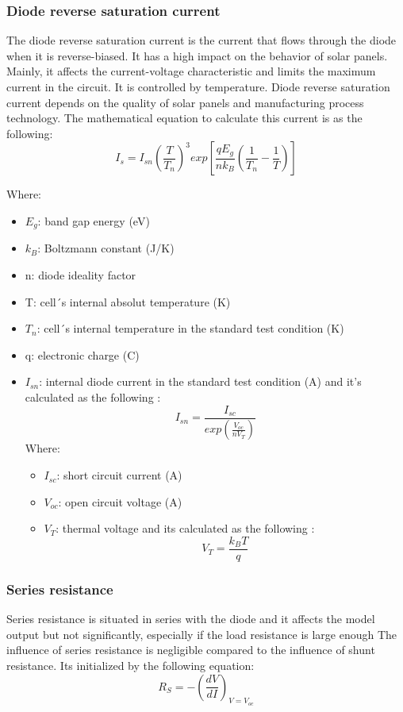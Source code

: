 \documentclass{report}
\begin{document}
\subsubsection{Diode reverse saturation current}
The diode reverse saturation current is the current that flows through the diode when it is reverse-biased. It has a high impact on the behavior of solar panels. Mainly, it affects the current-voltage characteristic and limits the maximum current in the circuit. It is controlled by temperature. Diode reverse saturation current depends on the quality of solar panels and manufacturing process technology. The mathematical equation to calculate this current is as the following:
\begin{equation}
I_{s} = I_{sn}\left(\frac{T}{T_{n}}\right)^3  exp\left[ \frac{qE_{g}}{nk_{B}} \left( \frac{1}{T_{n}} - \frac{1}{T} \right)\right] 
\end{equation}


Where:
\begin{itemize}
    \item $E_{g}$: band gap energy (eV)
    \item $k_{B}$: Boltzmann constant (J/K)
    \item n:  diode ideality factor
    \item T: cell´s internal absolut temperature (K)
    \item $T_{n}$: cell´s internal temperature in the standard test condition (K)
    \item q: electronic charge (C)
    \item $I_{sn}$: internal diode current in the standard test condition (A) and it's calculated as the following :
    \begin{equation}
I_{sn} = \frac{I_{sc}}{exp\left( \frac{V_{oc}}{nV_{T}} \right)}
\end{equation}
Where:
\begin{itemize}
    \item $I_{sc}$: short circuit current (A)
    \item $V_{oc}$: open circuit voltage (A)
    \item $V_{T}$: thermal voltage and its calculated as the following : 
    \begin{equation}
V_{T} = \frac{k_{B} T}{q}
\end{equation}
\end{itemize}
\end{itemize}

\subsubsection{Series resistance}
Series resistance is situated in series with the diode and it affects the model output but not significantly, especially if the load resistance is large enough  The influence of series resistance is negligible compared to the influence of shunt resistance. Its initialized by the following equation:
\begin{equation}
R_{S} = -\left( \frac{dV}{dI} \right)_{V=V_{oc}}
\end{equation}
\end{document}
